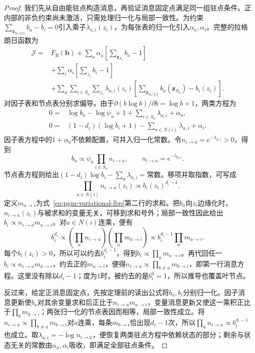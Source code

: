 \begin{proof}
  我们先从自由能驻点构造消息，再验证消息固定点满足同一组驻点条件。正内部的非负约束尚未激活，只需处理归一化与局部一致性。为约束$\sum_{\bm z_{S_a\setminus\{i\}}}b_a-b_i=0$引入乘子$\lambda_{a,i}(z_i)$，为每张表的归一化引入$\alpha_a,\alpha_i$。完整的拉格朗日函数为
  \[
    \begin{aligned}
      \mathscr J={}&F_{\mathrm B}(\bm b)
        +\sum_a\alpha_a\left[\sum_{\bm z_{S_a}}b_a-1\right]\\
       &+\sum_i\alpha_i\left[\sum_{z_i}b_i-1\right]\\
       &+\sum_a\sum_{i\in S_a}\sum_{z_i}\lambda_{a,i}(z_i)
          \left[\sum_{\bm z_{S_a\setminus\{i\}}}
                         b_a(\bm z_{S_a})-b_i(z_i)\right].
    \end{aligned}
  \]
  对因子表和节点表分别求偏导。由于$\partial(b\log b)/\partial b=\log b+1$，两类方程为
  \[
    \begin{aligned}
      0={}&\log b_a-\log\psi_a+1
                    +\sum_{i\in S_a}\lambda_{a,i}+\alpha_a,\\
      0={}&(1-d_i)(\log b_i+1)
                    -\sum_{a\in N(i)}\lambda_{a,i}+\alpha_i.
    \end{aligned}
  \]
  因子表方程中的$1+\alpha_a$不依赖配置，可并入归一化常数。令$n_{i\to a}=e^{-\lambda_{a,i}}>0$，得到
  \[
    b_a\propto\psi_a\prod_{i\in S_a}n_{i\to a},
    \qquad n_{i\to a}=e^{-\lambda_{a,i}}.
  \]
  节点表方程则给出$(1-d_i)\log b_i-\sum_a\lambda_{a,i}=\text{常数}$。移项并取指数，可写成
  \[
    \prod_{a\in N(i)}n_{i\to a}(z_i)
       \propto b_i(z_i)^{d_i-1}.
  \]
  定义$m_{a\to i}$为式~\eqref{eq:pgm-variational-lbp}第二行的求和。把$b_a$向$z_i$边缘化时，$n_{i\to a}(z_i)$与被求和的变量无关，可移到求和号外；局部一致性因此给出$b_i\propto n_{i\to a}m_{a\to i}$。对$a\in N(i)$连乘，便有
  \[
    b_i^{d_i}\propto
       \left(\prod_a n_{i\to a}\right)
       \left(\prod_a m_{a\to i}\right)
      \propto b_i^{d_i-1}\prod_a m_{a\to i}.
  \]
  每个$b_i(z_i)>0$，所以可以约去$b_i^{d_i-1}$，得到$b_i\propto\prod_a m_{a\to i}$。再代回任一$b_i\propto n_{i\to a}m_{a\to i}$，约去正的$m_{a\to i}$，便得$n_{i\to a}\propto\prod_{b\ne a}m_{b\to i}$，即第一行消息方程。这里没有除以$d_i-1$；度为$1$时，被约去的是$b_i^0=1$，所以推导也覆盖叶节点。

  反过来，给定正消息固定点，先按定理前的读出公式将$b_a,b_i$分别归一化。因子消息更新使$b_a$对其余变量求和后正比于$n_{i\to a}m_{a\to i}$，变量消息更新又使这一乘积正比于$\prod_b m_{b\to i}$；两张归一化的节点表因而相等，局部一致性成立。将$n_{i\to a}\propto\prod_{b\ne a}m_{b\to i}$对$a$连乘，每条$m_{b\to i}$恰出现$d_i-1$次，所以$\prod_a n_{i\to a}\propto b_i^{d_i-1}$也成立。取$\lambda_{a,i}=-\log n_{i\to a}$，便恢复两类驻点方程中依赖状态的部分；剩余与状态无关的常数由$\alpha_a,\alpha_i$吸收，即满足全部驻点条件。
\end{proof}

